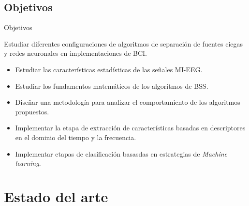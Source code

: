 \documentclass[10pt]{beamer}
\begin{document}
\subsection{Objetivos}
\begin{frame}{Objetivos}

Estudiar diferentes configuraciones de algoritmos de separación de fuentes ciegas y redes neuronales en implementaciones de BCI.

\begin{itemize}
\item Estudiar las características estadísticas de las señales MI-EEG.
\item Estudiar los fundamentos matemáticos de los algoritmos de BSS.
\item Diseñar una metodología para analizar el comportamiento de los algoritmos propuestos.
\item Implementar la etapa de extracción de características basadas en descriptores en el dominio del tiempo y la frecuencia.
\item Implementar etapas de clasificación basasdas en estrategias de \textit{Machine learning}.
\end{itemize}
\end{frame}





\section{Estado del arte}
\end{document}
